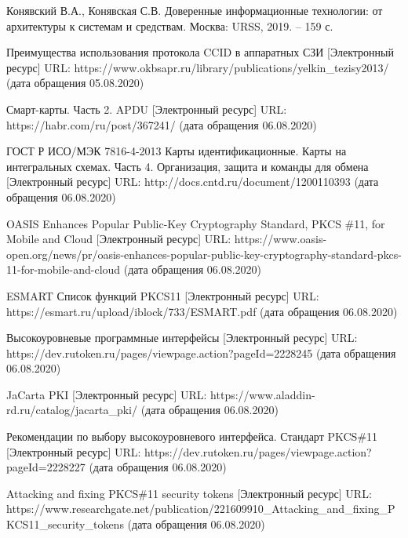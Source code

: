 \begingroup 
\renewcommand{\section}[2]{\anonsection{Библиографический список}}
\begin{thebibliography}{00}

  Конявский В.А., Конявская С.В. Доверенные информационные
  технологии: от архитектуры к системам и средствам. Москва: URSS,
  2019. – 159 с.

  Преимущества использования протокола CCID в аппаратных СЗИ
  [Электронный ресурс] URL:
  https://www.okbsapr.ru/library/publications/yelkin\_tezisy2013/
  (дата обращения 05.08.2020)

  Смарт-карты. Часть 2. APDU
  [Электронный ресурс] URL:
  https://habr.com/ru/post/367241/
  (дата обращения 06.08.2020)

  ГОСТ Р ИСО/МЭК 7816-4-2013 Карты идентификационные. Карты на интегральных схемах. Часть 4. Организация, защита и команды для обмена
  [Электронный ресурс] URL:
  http://docs.cntd.ru/document/1200110393
  (дата обращения 06.08.2020)

  OASIS Enhances Popular Public-Key Cryptography Standard, PKCS \#11, for Mobile and Cloud
  [Электронный ресурс] URL:
  https://www.oasis-open.org/news/pr/oasis-enhances-popular-public-key-cryptography-standard-pkcs-11-for-mobile-and-cloud
  (дата обращения 06.08.2020)

  ESMART Список функций PKCS11
  [Электронный ресурс] URL:
  https://esmart.ru/upload/iblock/733/ESMART.pdf
  (дата обращения 06.08.2020)

  Высокоуровневые программные интерфейсы
  [Электронный ресурс] URL:
  https://dev.rutoken.ru/pages/viewpage.action?pageId=2228245
  (дата обращения 06.08.2020)

  JaCarta PKI
  [Электронный ресурс] URL:
  https://www.aladdin-rd.ru/catalog/jacarta\_pki/
  (дата обращения 06.08.2020)

  Рекомендации по выбору высокоуровневого интерфейса. Стандарт PKCS\#11
  [Электронный ресурс] URL:
  https://dev.rutoken.ru/pages/viewpage.action?pageId=2228227
  (дата обращения 06.08.2020)

  Attacking and fixing PKCS\#11 security tokens
  [Электронный ресурс] URL:
  https://www.researchgate.net/publication/221609910\_Attacking\_and\_fixing\_PKCS11\_security\_tokens
  (дата обращения 06.08.2020)


\end{thebibliography}
